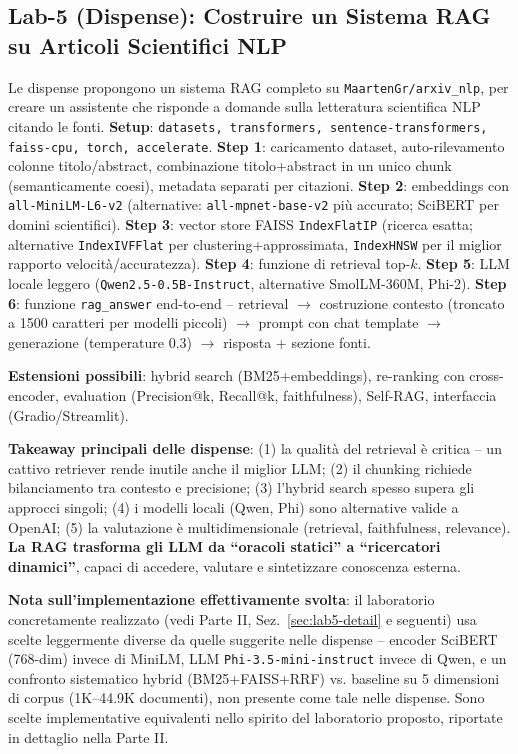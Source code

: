 \documentclass[12pt,a4paper]{article}
\begin{document}
\subsection{Lab-5 (Dispense): Costruire un Sistema RAG su Articoli Scientifici NLP}\label{sec:lab5-overview}

\begin{defbox}
Le dispense propongono un sistema RAG completo su \texttt{MaartenGr/arxiv\_nlp}, per creare un assistente che risponde a domande sulla letteratura scientifica NLP citando le fonti. \textbf{Setup}: \texttt{datasets, transformers, sentence-transformers, faiss-cpu, torch, accelerate}. \textbf{Step 1}: caricamento dataset, auto-rilevamento colonne titolo/abstract, combinazione titolo+abstract in un unico chunk (semanticamente coesi), metadata separati per citazioni. \textbf{Step 2}: embeddings con \texttt{all-MiniLM-L6-v2} (alternative: \texttt{all-mpnet-base-v2} pi\`u accurato; SciBERT per domini scientifici). \textbf{Step 3}: vector store FAISS \texttt{IndexFlatIP} (ricerca esatta; alternative \texttt{IndexIVFFlat} per clustering+approssimata, \texttt{IndexHNSW} per il miglior rapporto velocit\`a/accuratezza). \textbf{Step 4}: funzione di retrieval top-$k$. \textbf{Step 5}: LLM locale leggero (\texttt{Qwen2.5-0.5B-Instruct}, alternative SmolLM-360M, Phi-2). \textbf{Step 6}: funzione \texttt{rag\_answer} end-to-end -- retrieval $\to$ costruzione contesto (troncato a 1500 caratteri per modelli piccoli) $\to$ prompt con chat template $\to$ generazione (temperature 0.3) $\to$ risposta + sezione fonti.
\end{defbox}

\textbf{Estensioni possibili}: hybrid search (BM25+embeddings), re-ranking con cross-encoder, evaluation (Precision@k, Recall@k, faithfulness), Self-RAG, interfaccia (Gradio/Streamlit).

\textbf{Takeaway principali delle dispense}: (1) la qualit\`a del retrieval \`e critica -- un cattivo retriever rende inutile anche il miglior LLM; (2) il chunking richiede bilanciamento tra contesto e precisione; (3) l'hybrid search spesso supera gli approcci singoli; (4) i modelli locali (Qwen, Phi) sono alternative valide a OpenAI; (5) la valutazione \`e multidimensionale (retrieval, faithfulness, relevance). \textbf{La RAG trasforma gli LLM da ``oracoli statici'' a ``ricercatori dinamici''}, capaci di accedere, valutare e sintetizzare conoscenza esterna.

\begin{quizbox}
\textbf{Nota sull'implementazione effettivamente svolta}: il laboratorio concretamente realizzato (vedi Parte II, Sez.~\ref{sec:lab5-detail} e seguenti) usa scelte leggermente diverse da quelle suggerite nelle dispense -- encoder SciBERT (768-dim) invece di MiniLM, LLM \texttt{Phi-3.5-mini-instruct} invece di Qwen, e un confronto sistematico hybrid (BM25+FAISS+RRF) vs. baseline su 5 dimensioni di corpus (1K--44.9K documenti), non presente come tale nelle dispense. Sono scelte implementative equivalenti nello spirito del laboratorio proposto, riportate in dettaglio nella Parte II.
\end{quizbox}
\end{document}
